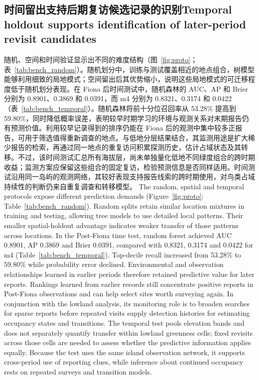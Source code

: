 \subsection{\ifzh 时间留出支持后期复访候选记录的识别\else Temporal holdout supports identification of later-period revisit candidates\fi}
\label{sec:additionalvalidation}
\ifzh
随机、空间和时间验证显示出不同的难度结构（图~\ref{fig:proto}；表~\ref{tab:bench_random}）。随机划分中，训练与测试覆盖相近的地点组合，树模型能够利用细致的局地模式；空间留出后其优势缩小，说明这些局地模式的可迁移程度低于随机划分表现。在 Fiona 后时间测试中，随机森林的 AUC、AP 和 Brier 分别为 0.8901、0.3869 和 0.0391，而 m4 分别为 0.8321、0.3174 和 0.0422（表~\ref{tab:bench_temporal}）。随机森林将前十分位召回率从 53.28\% 提高到 59.80\%，同时降低概率误差，表明较早时期学习的环境与观测关系对末期报告仍有预测价值。利用较早记录得到的排序仍能在 Fiona 后的观测中集中较多正报告，可用于筛选值得重新调查的地点。与低地分层结果结合，其监测用途是扩大稀少报告的检索，再通过同一地点的重复访问积累探测历史，估计占域状态及其转移。不过，该时间测试汇总所有海拔层，尚未单独量化低地不同绿度组合的跨时期收益；监测方案应保留这些组合的固定复访，检验预测信息是否同样适用。时间测试沿用同一岛屿的观测网络，其较好表现支持报告线索的跨时期使用，对鸟类占域持续性的判断仍来自重复调查和转移模型。
\else
The random, spatial and temporal protocols expose different prediction demands (Figure~\ref{fig:proto}; Table~\ref{tab:bench_random}). Random splits retain similar location mixtures in training and testing, allowing tree models to use detailed local patterns. Their smaller spatial-holdout advantage indicates weaker transfer of those patterns across locations. In the Post-Fiona time test, random forest achieved AUC 0.8901, AP 0.3869 and Brier 0.0391, compared with 0.8321, 0.3174 and 0.0422 for m4 (Table~\ref{tab:bench_temporal}). Top-decile recall increased from 53.28\% to 59.80\% while probability error declined. Environmental and observation relationships learned in earlier periods therefore retained predictive value for later reports. Rankings learned from earlier records still concentrate positive reports in Post-Fiona observations and can help select sites worth surveying again. In conjunction with the lowland analysis, its monitoring role is to broaden searches for sparse reports before repeated visits supply detection histories for estimating occupancy states and transitions. The temporal test pools elevation bands and does not separately quantify transfer within lowland greenness cells; fixed revisits across those cells are needed to assess whether the predictive information applies equally. Because the test uses the same island observation network, it supports cross-period use of reporting clues, while inference about continued occupancy rests on repeated surveys and transition models.
